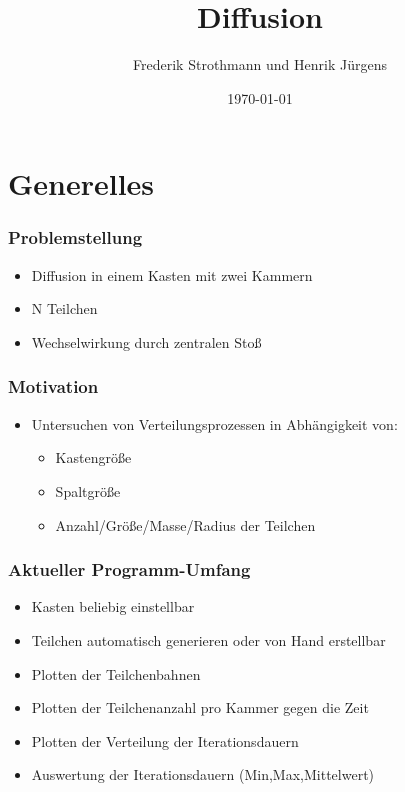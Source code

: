 \documentclass{beamer}
\title{Diffusion}
\author{Frederik Strothmann und Henrik Jürgens}
\date{\today}
\begin{document}
\maketitle
\frame{\tableofcontents[currentsection]}
 


\section{Generelles}

\begin{frame} %
  \frametitle{Problemstellung} %
 \begin{itemize}
 		\item Diffusion in einem Kasten mit zwei Kammern
        \item N Teilchen
        \item Wechselwirkung durch zentralen Stoß
\end{itemize}
\end{frame}

\begin{frame} %
  \frametitle{Motivation} %
 \begin{itemize}
 		\item Untersuchen von Verteilungsprozessen in Abhängigkeit von:
 		\begin{itemize}
 			\item Kastengröße
 			\item Spaltgröße
 			\item Anzahl/Größe/Masse/Radius der Teilchen
 		\end{itemize}
\end{itemize}
\end{frame}


\begin{frame} %
  \frametitle{Aktueller Programm-Umfang} %
 \begin{itemize}
 		\item Kasten beliebig einstellbar
 		\item Teilchen automatisch generieren oder von Hand erstellbar
 		\item Plotten der Teilchenbahnen
 		\item Plotten der Teilchenanzahl pro Kammer gegen die Zeit
 		\item Plotten der Verteilung der Iterationsdauern
 		\item Auswertung der Iterationsdauern (Min,Max,Mittelwert)
\end{itemize}
\end{frame}
\end{document}
